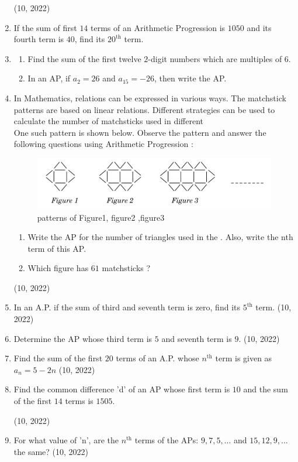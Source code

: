 \begin{enumerate}[label=\thesubsection.\arabic*,ref=\thesubsection.\theenumi,itemsep=1pt]
        \hfill (10, 2022) \item If the sum of first $14$ terms of an Arithmetic Progression is $1050$ and its fourth term is $40$, find its $20^{\text{th}}$ term.

     \item 
    \begin{enumerate}
         \item Find the sum of the first twelve $2$-digit numbers which are 
multiples of $6$.

         \item In an AP, if $a_2=26$ and $a _ {15} = -26$, then write the AP.
        \end{enumerate}
         \item In Mathematics, relations can be expressed in various ways. The 
matchstick patterns are based on linear relations. Different strategies 
can be used to calculate the number of matchsticks used in different 
 \\One such pattern is shown below. Observe the pattern and answer the 
following questions using Arithmetic Progression :
\begin{figure}[H]
    \centering
	\includegraphics[width=\columnwidth]{figs/ap/ap.jpg}
	\caption{patterns of Figure1, figure2 ,figure3}
    \label{fig:ap}
\end{figure}
    \begin{enumerate}
	 \item Write the AP for the number of triangles used in the . Also, 
write the nth term of this AP.
 \item Which figure has $61$ matchsticks ? 
    \end{enumerate} 

    \hfill (10, 2022) 
 \item In an A.P. if the sum of third and seventh term is zero, find its $5^{\text{th}}$ term.
        \hfill (10, 2022)
  \item Determine the AP whose third term is $5$ and seventh term is $9$.
        \hfill (10, 2022) \item Find the sum of the first $20$ terms of an A.P. whose $n^{\text{th}}$ term is given as $a_n=5-2n$
        \hfill (10, 2022) \item Find the common difference 'd' of an AP whose first term is $10$ and the sum of the first $14$ terms is $1505$.

        \hfill (10, 2022) \item For what value of 'n', are the $n^{\text{th}}$ terms of the APs: $9,7,5,\dots$ and $15,12,9,\dots$ the same?
    \hfill (10, 2022)
\end{enumerate}
